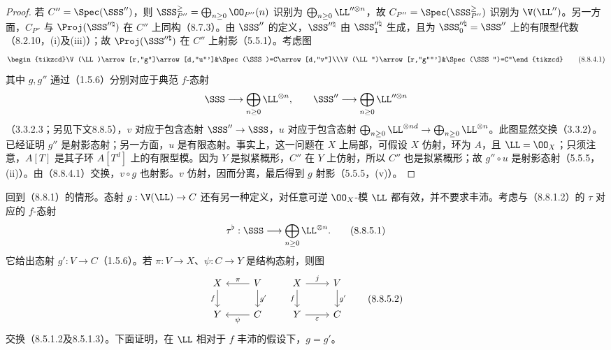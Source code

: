 \begin{proof}
若 $C''=\Spec(\SSS'')$，则 $\SSS_{P''}^{\geq}=\bigoplus_{n\geq0}\OO_{P''}(n)$ 识别为 $\bigoplus_{n\geq0}\LL''^{\otimes n}$，故 $C_{P''}=\Spec(\SSS_{P''}^{\geq})$ 识别为 $\V(\LL'')$。另一方面，$C_{P''}$ 与 $\Proj(\SSS''^{\natural})$ 在 $C''$ 上同构（8.7.3）。由 $\SSS''$ 的定义，$\SSS''^{\natural}$ 由 $\SSS''^{\natural}_1$ 生成，且为 $\SSS''^{\natural}_0=\SSS''$ 上的有限型代数（8.2.10，(i)及(iii)）；故 $\Proj(\SSS''^{\natural})$ 在 $C''$ 上射影（5.5.1）。考虑图
\begin{equation}\begin{tikzcd}\V(\LL)\arrow[r,"g"]\arrow[d,"u"']&\Spec(\SSS)=C\arrow[d,"v"]\\\V(\LL'')\arrow[r,"g''"']&\Spec(\SSS'')=C''\end{tikzcd}\tag{8.8.4.1}\end{equation}
其中 $g,g''$ 通过（1.5.6）分别对应于典范 $f$-态射
\[\SSS\longrightarrow\bigoplus_{n\geq0}\LL^{\otimes n},\qquad
\SSS''\longrightarrow\bigoplus_{n\geq0}\LL''^{\otimes n}\]
（3.3.2.3；另见下文8.8.5），$v$ 对应于包含态射 $\SSS''\to\SSS$，$u$ 对应于包含态射 $\bigoplus_{n\geq0}\LL^{\otimes nd}\to\bigoplus_{n\geq0}\LL^{\otimes n}$。此图显然交换（3.3.2）。已经证明 $g''$ 是射影态射；另一方面，$u$ 是有限态射。事实上，这一问题在 $X$ 上局部，可假设 $X$ 仿射，环为 $A$，且 $\LL=\OO_X$；只须注意，$A[T]$ 是其子环 $A[T^d]$ 上的有限型模。因为 $Y$ 是拟紧概形，$C''$ 在 $Y$ 上仿射，所以 $C''$ 也是拟紧概形；故 $g''\circ u$ 是射影态射（5.5.5，(ii)）。由（8.8.4.1）交换，$v\circ g$ 也射影。$v$ 仿射，因而分离，最后得到 $g$ 射影（5.5.5，(v)）。
\end{proof}

 回到（8.8.1）的情形。态射 $g:\V(\LL)\to C$ 还有另一种定义，对任意可逆 $\OO_X$-模 $\LL$ 都有效，并不要求丰沛。考虑与（8.8.1.2）的 $\tau$ 对应的 $f$-态射
\begin{equation}\tau^\flat:\SSS\longrightarrow\bigoplus_{n\geq0}\LL^{\otimes n}.\tag{8.8.5.1}\end{equation}
它给出态射 $g':V\to C$（1.5.6）。若 $\pi:V\to X$、$\psi:C\to Y$ 是结构态射，则图
\begin{equation}\begin{gathered}
\begin{tikzcd}X\arrow[d,"f"']&V\arrow[l,"\pi"']\arrow[d,"g'"]\\Y&C\arrow[l,"\psi"]\end{tikzcd}
\qquad
\begin{tikzcd}X\arrow[r,"j"]\arrow[d,"f"']&V\arrow[d,"g'"]\\Y\arrow[r,"\varepsilon"']&C\end{tikzcd}
\end{gathered}\tag{8.8.5.2}\end{equation}
交换（8.5.1.2及8.5.1.3）。下面证明，在 $\LL$ 相对于 $f$ 丰沛的假设下，$g=g'$。

